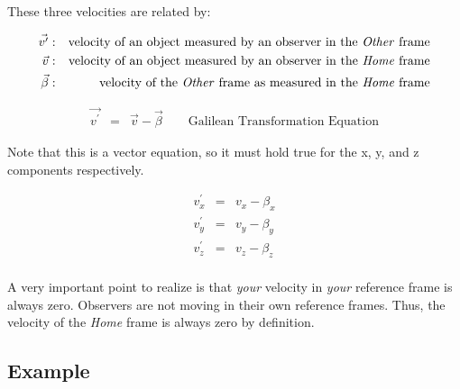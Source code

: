 These three velocities are related by:

\begin{eqnarray*}
	\vec{v^\prime} & : & \mbox{velocity of an object measured by an observer in the \emph{Other} frame} \\
	\vec{v} & : &  \mbox{velocity of an object measured by an observer in the \emph{Home} frame} \\
	\vec{\beta} & : &  \mbox{velocity of the \emph{Other} frame as measured in the \emph{Home} frame}\\
\end{eqnarray*}

\begin{eqnarray*}
	\vec{v^\prime} & = & \vec{v} - \vec{\beta} \qquad \mbox{Galilean Transformation Equation}
\end{eqnarray*}

Note that this is a vector equation, so it must hold true for the x, y, and z components respectively.

\begin{eqnarray*}
	v^\prime_x & = & v_x - \beta_x \\
	v^\prime_y & = & v_y - \beta_y \\
	v^\prime_z & = & v_z - \beta_z \\
\end{eqnarray*}

A very important point to realize is that \emph{your} velocity in \emph{your} reference frame is always zero. Observers are not moving in their own reference frames. Thus, the velocity of the \emph{Home} frame is always zero by definition.

\subsection*{Example}

